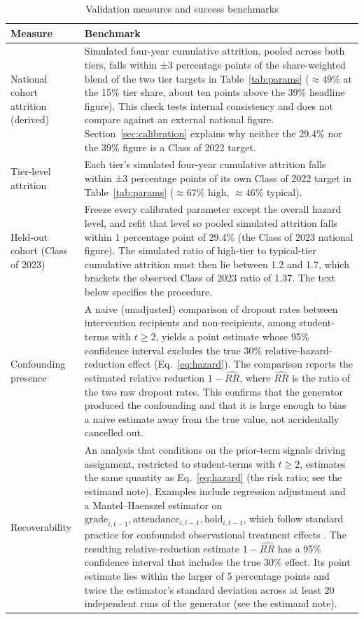 \documentclass[11pt]{article}
\begin{document}
\begin{table}[t]
\caption{Validation measures and success benchmarks}
\label{tab:validation}
\centering
\small
\renewcommand{\arraystretch}{1.2}
\begin{tabular}{@{}p{}p{}@{}}
\toprule
\textbf{Measure} & \textbf{Benchmark} \\
\midrule
National cohort attrition (derived) & Simulated four-year cumulative attrition, pooled across both tiers, falls within ±3 percentage points of the share-weighted blend of the two tier targets in Table~\ref{tab:params} ($\approx$49\% at the 15\% tier share, about ten points above the 39\% headline figure). This check tests internal consistency and does not compare against an external national figure. Section~\ref{sec:calibration} explains why neither the 29.4\% nor the 39\% figure is a Class of 2022 target. \\
\addlinespace
Tier-level attrition & Each tier's simulated four-year cumulative attrition falls within ±3 percentage points of its own Class of 2022 target in Table~\ref{tab:params} ($\approx$67\% high, $\approx$46\% typical). \\
\addlinespace
Held-out cohort (Class of 2023) & Freeze every calibrated parameter except the overall hazard level, and refit that level so pooled simulated attrition falls within 1 percentage point of 29.4\% (the Class of 2023 national figure). The simulated ratio of high-tier to typical-tier cumulative attrition must then lie between 1.2 and 1.7, which brackets the observed Class of 2023 ratio of 1.37. The text below specifies the procedure. \\
\addlinespace
Confounding presence & A naive (unadjusted) comparison of dropout rates between intervention recipients and non-recipients, among student-terms with $t \ge 2$, yields a point estimate whose 95\% confidence interval excludes the true 30\% relative-hazard-reduction effect (Eq.~\ref{eq:hazard}). The comparison reports the estimated relative reduction $1-\widehat{RR}$, where $\widehat{RR}$ is the ratio of the two raw dropout rates. This confirms that the generator produced the confounding and that it is large enough to bias a naive estimate away from the true value, not accidentally cancelled out. \\
\addlinespace
Recoverability & An analysis that conditions on the prior-term signals driving assignment, restricted to student-terms with $t \ge 2$, estimates the same quantity as Eq.~\ref{eq:hazard} (the risk ratio; see the estimand note). Examples include regression adjustment and a Mantel--Haenszel estimator on $\text{grade}_{i,t-1}, \text{attendance}_{i,t-1}, \text{hold}_{i,t-1}$, which follow standard practice for confounded observational treatment effects \citep{gelman2020ros}. The resulting relative-reduction estimate $1-\widehat{RR}$ has a 95\% confidence interval that includes the true 30\% effect. Its point estimate lies within the larger of 5 percentage points and twice the estimator's standard deviation across at least 20 independent runs of the generator (see the estimand note). \\

\end{tabular}
\end{table}
\end{document}
